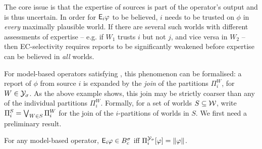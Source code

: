 The core issue is that
the expertise of sources is part of the operator's output and is thus
uncertain. In order for $\mathsf{E}_i\varphi$ to be believed, $i$ needs to be trusted on
$\phi$ in \emph{every} maximally plausible world. If there are several such
worlds with different assessments of expertise -- e.g. if $W_1$ trusts $i$ but
not $j$, and vice versa in $W_2$ -- then EC-selectivity requires reports to be
significantly weakened before expertise can be believed in \emph{all} worlds.

For model-based operators satisfying \soundness{}, this phenomenon can be
formalised: a report of $\phi$ from source $i$ is expanded by the
\emph{join}\footnotemark{} of the partitions $\Pi^W_i$, for $W \in \mathcal{Y}_\sigma$.
As the above example shows, this join may be strictly coarser than any of the
individual partitions $\Pi^W_i$. Formally, for a set of worlds $S \subseteq
\mathcal{W}$, write $\Pi^S_i = \bigvee_{W \in S}{\Pi^W_i}$ for the join of the
$i$-partitions of worlds in $S$. We first need a preliminary result.


\begin{lemma}
    \label{kr_lemma_expertise_join}
    For any model-based operator, $\mathsf{E}_i\varphi \in B^\sigma_c$ iff
    $\Pi^{\mathcal{Y}_\sigma}_i[\varphi] = \|{\varphi}\|$.
\end{lemma}

